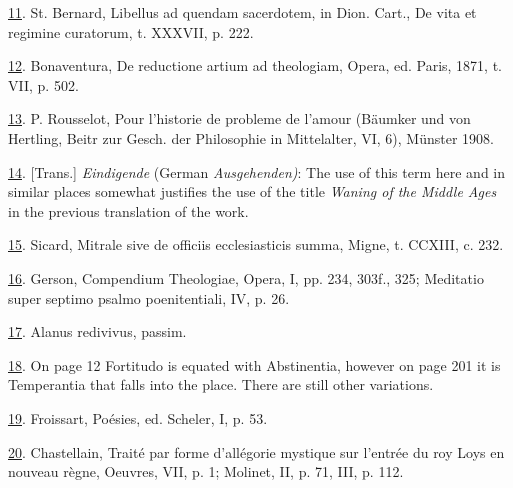 \protect\hypertarget{23_NOTES.xhtmlux5cux23id_772}{\protect\hyperlink{16_Chapter_Nine__THE_DECLINE_OF_SYM.xhtmlux5cux23id_771}{11}}.
St. Bernard, Libellus ad quendam sacerdotem, in Dion. Cart., De vita et
regimine curatorum, t. XXXVII, p. 222.

\protect\hypertarget{23_NOTES.xhtmlux5cux23id_770}{\protect\hyperlink{16_Chapter_Nine__THE_DECLINE_OF_SYM.xhtmlux5cux23id_769}{12}}.
Bonaventura, De reductione artium ad theologiam, Opera, ed. Paris, 1871,
t. VII, p. 502.

\protect\hypertarget{23_NOTES.xhtmlux5cux23id_768}{\protect\hyperlink{16_Chapter_Nine__THE_DECLINE_OF_SYM.xhtmlux5cux23id_767}{13}}.
P. Rousselot, Pour l'historie de probleme de l'amour (Bäumker und von
Hertling, Beitr zur Gesch. der Philosophie in Mittelalter, VI, 6),
Münster 1908.

\protect\hypertarget{23_NOTES.xhtmlux5cux23id_766}{\protect\hyperlink{16_Chapter_Nine__THE_DECLINE_OF_SYM.xhtmlux5cux23id_765}{14}}.
{[}Trans.{]} \emph{Eindigende} (German \emph{Ausgehenden)}: The use of
this term here and in similar places somewhat justifies the use of the
title \emph{Waning of the Middle Ages} in the previous translation of
the work.

\protect\hypertarget{23_NOTES.xhtmlux5cux23id_764}{\protect\hyperlink{16_Chapter_Nine__THE_DECLINE_OF_SYM.xhtmlux5cux23id_763}{15}}.
Sicard, Mitrale sive de officiis ecclesiasticis summa, Migne, t. CCXIII,
c. 232.

\protect\hypertarget{23_NOTES.xhtmlux5cux23id_762}{\protect\hyperlink{16_Chapter_Nine__THE_DECLINE_OF_SYM.xhtmlux5cux23id_761}{16}}.
Gerson, Compendium Theologiae, Opera, I, pp. 234, 303f., 325; Meditatio
super septimo psalmo poenitentiali, IV, p. 26.

\protect\hypertarget{23_NOTES.xhtmlux5cux23id_760}{\protect\hyperlink{16_Chapter_Nine__THE_DECLINE_OF_SYM.xhtmlux5cux23id_759}{17}}.
Alanus redivivus, passim.

\protect\hypertarget{23_NOTES.xhtmlux5cux23id_758}{\protect\hyperlink{16_Chapter_Nine__THE_DECLINE_OF_SYM.xhtmlux5cux23id_757}{18}}.
On page 12 Fortitudo is equated with Abstinentia, however on page 201 it
is Temperantia that falls into the place. There are still other
variations.

\protect\hypertarget{23_NOTES.xhtmlux5cux23page_426}{\protect\hyperlink{16_Chapter_Nine__THE_DECLINE_OF_SYM.xhtmlux5cux23id_756}{19}}.
Froissart, Poésies, ed. Scheler, I, p. 53.

\protect\hypertarget{23_NOTES.xhtmlux5cux23id_755}{\protect\hyperlink{16_Chapter_Nine__THE_DECLINE_OF_SYM.xhtmlux5cux23id_754}{20}}.
Chastellain, Traité par forme d'allégorie mystique sur l'entrée du roy
Loys en nouveau règne, Oeuvres, VII, p. 1; Molinet, II, p. 71, III, p.
112.

